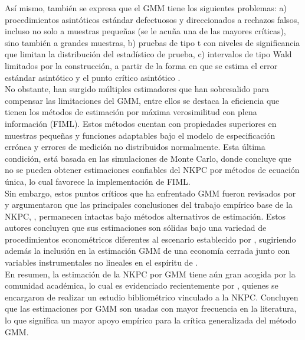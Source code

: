 Así mismo, también se expresa que el GMM tiene los siguientes problemas: a) procedimientos asintóticos estándar defectuosos y direccionados a rechazos falsos, incluso no solo a muestras pequeñas (se le acuña una de las mayores críticas), sino también a grandes muestras, b) pruebas de tipo t con niveles de significancia que limitan la distribución del estadístico de prueba, c) intervalos de tipo Wald limitados por la construcción, a partir de la forma en que se estima el error estándar asintótico y el punto crítico asintótico \citep{dufour1997some}.\\

No obstante, han surgido múltiples estimadores que han sobresalido para compensar las limitaciones del GMM, entre ellos se destaca la eficiencia que tienen los métodos de estimación por máxima verosimilitud con plena información (FIML). Estos métodos cuentan con propiedades superiores en muestras pequeñas \citep{lendvai2005hungarian} y  funciones adaptables bajo el modelo de especificación errónea y errores de medición no distribuidos normalmente. Esta última condición, está basada en las simulaciones de Monte Carlo, donde \cite{linde2005estimating} concluye que no se pueden obtener estimaciones confiables del NKPC por métodos de ecuación única, lo cual favorece la implementación de FIML.\\

Sin embargo, estos puntos críticos que ha enfrentado GMM fueron revisados por  \cite{gali2005robustness} y argumentaron que las principales conclusiones del trabajo empírico base de la NKPC, 	\cite{gali1999inflation}, permanecen intactas bajo métodos alternativos de estimación. Estos autores concluyen que sus estimaciones son sólidas bajo una variedad de procedimientos econométricos diferentes al escenario establecido por \cite{rudd2005new}, sugiriendo además la inclusión en la estimación GMM de una economía cerrada junto con variables instrumentales no lineales en el espíritu de \cite{linde2005estimating}.\\

En resumen, la estimación de la NKPC por GMM tiene aún gran acogida por la comunidad académica, lo cual es evidenciado recientemente por   \cite{fidrmuc2020meta}, quienes se encargaron de realizar un estudio bibliométrico vinculado a la NKPC. Concluyen que las estimaciones por GMM son usadas con mayor frecuencia en la literatura, lo que significa un mayor apoyo empírico para la crítica generalizada del método GMM. %


